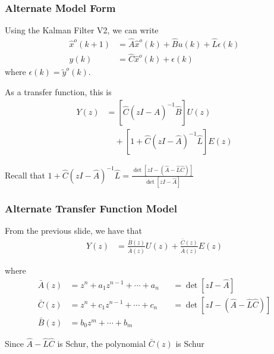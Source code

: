 \begin{frame}
    \frametitle{Alternate Model Form}

    Using the Kalman Filter V2, we can write
    \begin{align*}
        \hat{x}^o(k+1) & = \hat{A} \hat{x}^o(k) + \hat{B} u(k) + \hat{L} \epsilon(k) \\
        y(k) & = \hat{C} \hat{x}^o(k) + \epsilon(k)
    \end{align*}
    where $\epsilon(k) = \tilde{y}^o(k)$.
    \pause

    As a transfer function, this is
    \begin{align*}
        Y(z) & = [\hat{C} (zI - \hat{A})^{-1} \hat{B}] U(z) \\
        & \quad + [1 + \hat{C} (zI - \hat{A})^{-1} \hat{L}] E(z)
    \end{align*}
    \paused

    Recall that $\displaystyle{ 1 + \hat{C} (zI - \hat{A})^{-1} \hat{L} = \frac{\det[zI-(\hat{A}-\hat{L}\hat{C})]}{\det[zI-\hat{A}]} }$

\end{frame}

\begin{frame}
    \frametitle{Alternate Transfer Function Model}

    From the previous slide, we have that
    \begin{align*}
        Y(z) & = \frac{\bar{B}(z)}{\bar{A}(z)} U(z) + \frac{\bar{C}(z)}{\bar{A}(z)} E(z)
    \end{align*}
    \paused

    where
    \begin{align*}
        \bar{A}(z) & = z^n + a_1 z^{n-1} + \cdots + a_n && = \det[zI-\hat{A}] \\
        \bar{C}(z) & = z^n + c_1 z^{n-1} + \cdots + c_n && = \det[zI-(\hat{A}-\hat{L}\hat{C})] \\
        \bar{B}(z) & = b_0 z^m + \cdots + b_m
    \end{align*}
    \paused

    Since $\hat{A}-\hat{L}\hat{C}$ is Schur, the polynomial $\bar{C}(z)$ is Schur

\end{frame}

